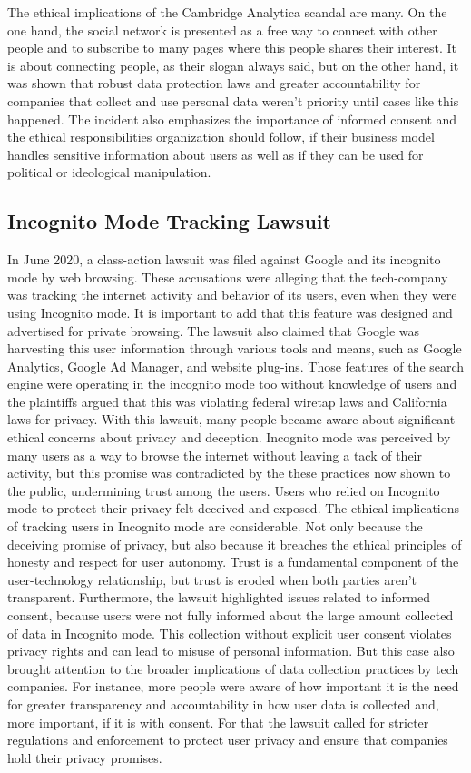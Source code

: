The ethical implications of the Cambridge Analytica scandal are many.
On the one hand, the social network is presented as a free way to connect with other people and to subscribe to many pages where this people shares their interest.
It is about connecting people, as their slogan always said, but on the other hand, it was shown that robust data protection laws and greater accountability for companies that collect and use personal data weren't priority until cases like this happened.
The incident also emphasizes the importance of informed consent and the ethical responsibilities organization should follow, if their business model handles sensitive information about users as well as if they can be used for political or ideological manipulation.

\subsection{Incognito Mode Tracking Lawsuit}\label{subsec:incognito-mode-tracking-lawsuit}
In June 2020, a class-action lawsuit was filed against Google and its incognito mode by web browsing\cite{Google2020_incognitoData}.
These accusations were alleging that the tech-company was tracking the internet activity and behavior of its users, even when they were using Incognito mode.
It is important to add that this feature was designed and advertised for private browsing.
The lawsuit also claimed that Google was harvesting this user information through various tools and means, such as Google Analytics, Google Ad Manager, and website plug-ins.
Those features of the search engine were operating in the incognito mode too without knowledge of users and the plaintiffs argued that this was violating federal wiretap laws and California laws for privacy.
With this lawsuit, many people became aware about significant ethical concerns about privacy and deception.
Incognito mode was perceived by many users as a way to browse the internet without leaving a tack of their activity, but this promise was contradicted by the these practices now shown to the public, undermining trust among the users.
Users who relied on Incognito mode to protect their privacy felt deceived and exposed.
The ethical implications of tracking users in Incognito mode are considerable.
Not only because the deceiving promise of privacy, but also because it breaches the ethical principles of honesty and respect for user autonomy.
Trust is a fundamental component of the user-technology relationship, but trust is eroded when both parties aren't transparent.
Furthermore, the lawsuit highlighted issues related to informed consent, because users were not fully informed about the large amount collected of data in Incognito mode.
This collection without explicit user consent violates privacy rights and can lead to misuse of personal information.
But this case also brought attention to the broader implications of data collection practices by tech companies.
For instance, more people were aware of how important it is the need for greater transparency and accountability in how user data is collected and, more important, if it is with consent.
For that the lawsuit called for stricter regulations and enforcement to protect user privacy and ensure that companies hold their privacy promises.

